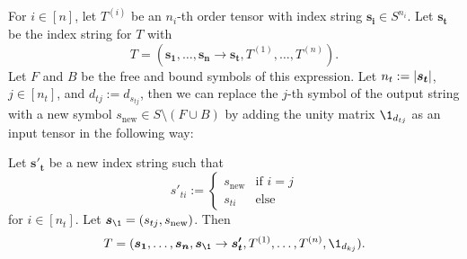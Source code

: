\begin{lemma}
    For $i \in [n]$, let $T^{(i)}$ be an $n_i$-th order tensor with index string $\bm{s_i} \in S^{n_i}$.
    Let $\bm{s_t}$ be the index string for $T$ with
    $$T = (\bm{s_1}, \dots, \bm{s_n} \rightarrow \bm{s_t}, T^{(1)}, \dots, T^{(n)}).$$
    Let $F$ and $B$ be the free and bound symbols of this expression.
    Let $n_t := \left\lvert \bm{s_t} \right\rvert$, $j \in [n_t]$, and $d_{tj} := d_{s_{tj}}$, then we can replace the $j$-th symbol of the output string with a new symbol $s_{\text{new}} \in S \setminus (F \cup B)$ by adding the unity matrix $\1_{d_{tj}}$ as an input tensor in the following way:

    Let $\bm{s'_t}$ be a new index string such that
    $$s'_{ti} := \begin{cases}
            s_{\text{new}} & \text{if $i = j$} \\
            s_{ti}         & \text{else}
        \end{cases}$$
    for $i \in [n_t]$.
    Let $\bm{s_\1} = (s_{tj}, s_{\text{new}})$.
    Then
    $$T = (\bm{s_1}, \dots, \bm{s_n}, \bm{s_\1} \rightarrow \bm{s'_t}, T^{(1)}, \dots, T^{(n)}, \1_{d_{kj}}).$$
\end{lemma}

